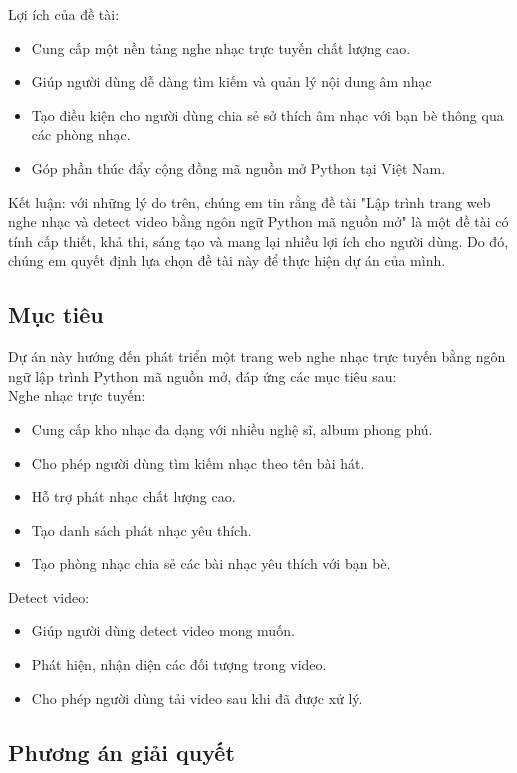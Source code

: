 \documentclass[a4paper]{article}
\begin{document}
	\indent Lợi ích của đề tài:
\begin{itemize}
	\item Cung cấp một nền tảng nghe nhạc trực tuyến chất lượng cao.
    \item Giúp người dùng dễ dàng tìm kiếm và quản lý nội dung âm nhạc
    \item Tạo điều kiện cho người dùng chia sẻ sở thích âm nhạc với bạn bè thông qua các phòng nhạc.
    \item Góp phần thúc đẩy cộng đồng mã nguồn mở Python tại Việt Nam.
\end{itemize}
    \indent Kết luận: với những lý do trên, chúng em tin rằng đề tài "Lập trình trang web nghe nhạc và detect video bằng ngôn ngữ Python mã nguồn mở" là một đề tài có tính cấp thiết, khả thi, sáng tạo và mang lại nhiều lợi ích cho người dùng. Do đó, chúng em quyết định lựa chọn đề tài này để thực hiện dự án của mình.

\subsection{Mục tiêu}
	\indent Dự án này hướng đến phát triển một trang web nghe nhạc trực tuyến bằng ngôn ngữ lập trình Python mã nguồn mở, đáp ứng các mục tiêu sau:
 \\
 \indent
    \indent Nghe nhạc trực tuyến:
\begin{itemize}
	\item Cung cấp kho nhạc đa dạng với nhiều nghệ sĩ, album phong phú.
    \item Cho phép người dùng tìm kiếm nhạc theo tên bài hát.
    \item Hỗ trợ phát nhạc chất lượng cao.
    \item Tạo danh sách phát nhạc yêu thích.
    \item Tạo phòng nhạc chia sẻ các bài nhạc yêu thích với bạn bè.
\end{itemize}
    \indent \indent
    \indent Detect video:
\begin{itemize}
	\item Giúp người dùng detect video mong muốn.
    \item Phát hiện, nhận diện các đối tượng trong video.
    \item Cho phép người dùng tải video sau khi đã được xử lý.
\end{itemize}


\subsection{Phương án giải quyết}
\end{document}
